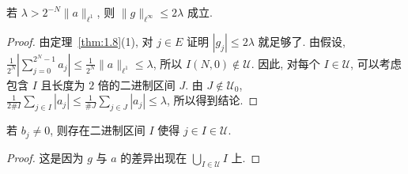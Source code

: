 \begin{lemma}\label{lem:1.3}
若 $\lambda > 2^{-N}\|a\|_{\ell^{1}}$, 则 $\|g\|_{\ell^{\infty}} \leq 2\lambda$ 成立.
\end{lemma}

\begin{proof}
由定理~\ref{thm:1.8}(1), 对 $j \in E$ 证明 $|g_{j}| \leq 2\lambda$ 就足够了. 由假设,
$\frac{1}{2^{N}}\left|\sum_{j=0}^{2^{N}-1} a_{j}\right| \leq \frac{1}{2^{N}}\|a\|_{\ell^{1}} \leq \lambda$,
所以 $I(N,0) \notin \mathcal{U}$. 因此, 对每个 $I \in \mathcal{U}$, 可以考虑包含 $I$ 且长度为 $2$ 倍的二进制区间 $J$. 由 $J \notin \mathcal{U}_{0}$, $\frac{1}{2\# I}\sum_{j \in I} |a_{j}| \leq \frac{1}{\# J}\sum_{j \in J} |a_{j}| \leq \lambda$, 所以得到结论.
\end{proof}

\begin{lemma}\label{lem:1.4}
若 $b_{j} \neq 0$, 则存在二进制区间 $I$ 使得 $j \in I \in \mathcal{U}$.
\end{lemma}

\begin{proof}
这是因为 $g$ 与 $a$ 的差异出现在 $\bigcup_{I \in \mathcal{U}} I$ 上.
\end{proof}

